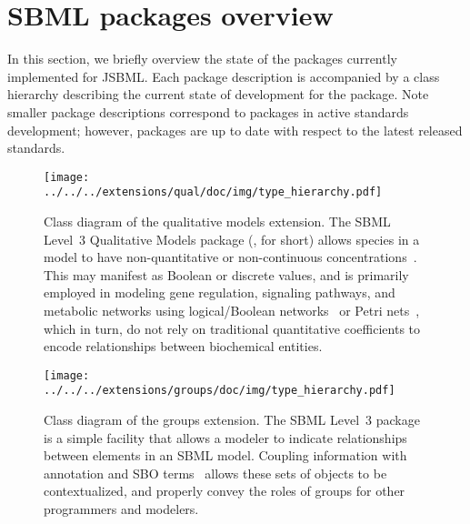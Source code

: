 
\section{SBML packages overview}
\label{sec:extensionsOverview}

In this section, we briefly overview the state of the \SBMLthree packages
currently implemented for JSBML. Each package description is accompanied by
a class hierarchy describing the current state of development for the
package. Note smaller package descriptions correspond to packages in active
standards development; however, packages are up to date with respect to the
latest released standards.

\begin{figure}[H]
  \vspace*{-3em}
 \centering
\texttt{[image: ../../../extensions/qual/doc/img/type\_hierarchy.pdf]}
 \vspace*{-5em}
 \caption[Class diagram of the qualitative models extension]{Class diagram of
   the qualitative models extension. The SBML Level~3 Qualitative Models
   package (, for short) allows species in a model to have
   non-quantitative or non-continuous concentrations~\cite{Chaouiya2013}.
   This may manifest as Boolean or discrete values, and is primarily employed
   in modeling gene regulation, signaling pathways, and metabolic networks
   using logical/Boolean networks~\cite{shmulevich2002} or Petri
   nets~\cite{breitling2008}, which in turn, do not rely on traditional
   quantitative coefficients to encode relationships between biochemical
   entities.}
 \label{fig:qual}
\end{figure}


\begin{figure}[H]
 \vspace*{-1em}
 \centering
\texttt{[image: ../../../extensions/groups/doc/img/type\_hierarchy.pdf]}
 \vspace*{-3em}
 \caption[Class diagram of the groups extension]{Class diagram of the groups
   extension. The SBML Level~3  package is a simple facility
   that allows a modeler to indicate relationships between elements in an
   SBML model. Coupling  information with annotation and SBO
   terms~\cite{Courtot2011a} allows these sets of objects to be
   contextualized, and properly convey the roles of groups for other
   programmers and modelers.}
 \label{fig:groups}
\end{figure}


